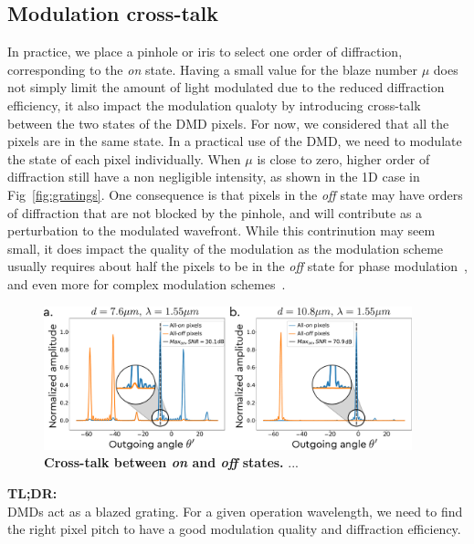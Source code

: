 \documentclass[12pt]{iopart}
\begin{document}
\subsection{Modulation cross-talk}

In practice, we place a pinhole or iris to select 
one order of diffraction,
corresponding to the {\em on} state.
Having a small value for the blaze number $\mu$
does not simply limit the amount of light modulated 
due to the reduced diffraction efficiency, 
it also impact the modulation qualoty by introducing cross-talk 
between the two states of the DMD pixels.
For now, we considered that all the pixels are in the same state. 
In a practical use of the DMD,
we need to modulate the state of each pixel individually.
When $\mu$ is close to zero, higher order of diffraction 
still have a non negligible intensity, 
as shown in the 1D case in Fig~\ref{fig:gratings}. 
One consequence is that pixels in the {\em off} state 
may have orders of diffraction that are not blocked by the pinhole, 
and will contribute as a perturbation to the modulated wavefront. 
While this contrinution may seem small, 
it does impact the quality of the modulation 
as the modulation scheme usually requires about half the pixels 
to be in the {\em off}  state for phase modulation~\cite{}, 
and even more for complex modulation schemes~\cite{}.\\

\begin{figure}
  \centering
  \includegraphics[width = 0.95\textwidth]{images/xtalk.pdf}
  \caption{
  \textbf{Cross-talk between {\em on} and {\em off} states.}
 ...
  }
  \label{fig:xtalk}
\end{figure}


\begin{tldr}
  \textbf{TL;DR:}\\
  DMDs act as a blazed grating. 
  For a given operation wavelength,
  we need to find the right pixel pitch 
  to have a good modulation quality 
  and diffraction efficiency.
  \end{tldr}
\end{document}
